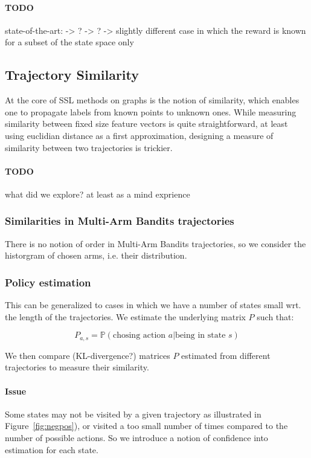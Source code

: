\documentclass{article}
\begin{document}
\paragraph{TODO} state-of-the-art:
\cite{Valko12} -> ?
\cite{Audiffren15} -> ?
\cite{Finn17} -> slightly different case in which the reward is known for a subset of the state space only

\subsection{Trajectory Similarity}

At the core of SSL methods on graphs is the notion of similarity, which enables one to propagate labels from known points to unknown ones. While measuring similarity between fixed size feature vectors is quite straightforward, at least using euclidian distance as a first approximation, designing a measure of similarity between two trajectories is trickier.

\paragraph{TODO}
what did we explore? at least as a mind exprience


\subsubsection{Similarities in Multi-Arm Bandits trajectories}

There is no notion of order in Multi-Arm Bandits trajectories, so we consider the historgram of chosen arms, i.e. their distribution.

\subsubsection{Policy estimation}

This can be generalized to cases in which we have a number of states small wrt. the length of the trajectories. We estimate the underlying matrix $P$ such that:

\[
P_{a,s} = \mathbb P(\text{chosing action } a | \text{being in state } s)
\]

We then compare (KL-divergence?) matrices $P$ estimated from different trajectories to measure their similarity.

\paragraph{Issue} Some states may not be visited by a given trajectory as illustrated in Figure~\ref{fig:negpos}), or visited a too small number of times compared to the number of possible actions. So we introduce a notion of confidence into estimation for each state.
\end{document}
